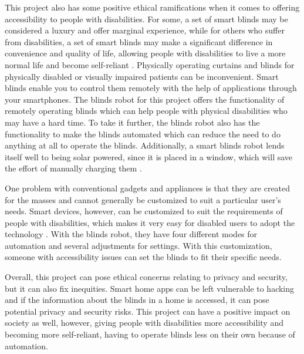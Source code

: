 \documentclass[10pt,twocolumn]{article}
\begin{document}
This project also has some positive ethical ramifications when it comes to offering accessibility to people with disabilities. For some, a set of smart blinds may be considered a luxury and offer marginal experience, while for others who suffer from disabilities, a set of smart blinds may make a significant difference in convenience and quality of life, allowing people with disabilities to live a more normal life and become self-reliant \cite{Panchwagh7Ways}. Physically operating curtains and blinds for physically disabled or visually impaired patients can be inconvenient. Smart blinds enable you to control them remotely with the help of applications through your smartphones. The blinds robot for this project offers the functionality of remotely operating blinds which can help people with physical disabilities who may have a hard time. To take it further, the blinds robot also has the functionality to make the blinds automated which can reduce the need to do anything at all to operate the blinds. Additionally, a smart blinds robot lends itself well to being solar powered, since it is placed in a window, which will save the effort of manually charging them \cite{Panchwagh7Ways}.

One problem with conventional gadgets and appliances is that they are created for the masses and cannot generally be customized to suit a particular user’s needs. Smart devices, however, can be customized to suit the requirements of people with disabilities, which makes it very easy for disabled users to adopt the technology \cite{Panchwagh7Ways}. With the blinds robot, they have four different modes for automation and several adjustments for settings. With this customization, someone with accessibility issues can set the blinds to fit their specific needs.

Overall, this project can pose ethical concerns relating to privacy and security, but it can also fix inequities. Smart home apps can be left vulnerable to hacking and if the information about the blinds in a home is accessed, it can pose potential privacy and security risks. This project can have a positive impact on society as well, however, giving people with disabilities more accessibility and becoming more self-reliant, having to operate blinds less on their own because of automation. 
\end{document}
